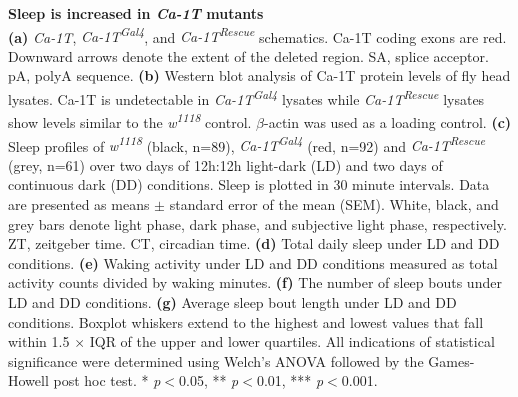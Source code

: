 \label{fig:3}
\textbf{Sleep is increased in \emph{Ca-\alpha1T} mutants}
\\
\textbf{(a)} \emph{Ca-\alpha1T}, \emph{Ca-\alpha1T\textsuperscript{Gal4}}, and \emph{Ca-\alpha1T\textsuperscript{Rescue}} schematics. 
Ca-\alpha1T coding exons are red.
Downward arrows denote the extent of the deleted region.
SA, splice acceptor.
pA, polyA sequence.  
\textbf{(b)} Western blot analysis of Ca-\alpha1T protein levels of fly head lysates.
Ca-\alpha1T is undetectable in \emph{Ca-\alpha1T\textsuperscript{Gal4}} lysates while \emph{Ca-\alpha1T\textsuperscript{Rescue}} lysates show levels similar to the \emph{w\textsuperscript{1118}} control.
$\beta$-actin was used as a loading control.
\textbf{(c)} Sleep profiles of \emph{w\textsuperscript{1118}} (black, n=89), \emph{Ca-\alpha1T\textsuperscript{Gal4}} (red, n=92) and \emph{Ca-\alpha1T\textsuperscript{Rescue}}  (grey, n=61) over two days of 12h:12h light-dark (LD) and two days of continuous dark (DD) conditions.
Sleep is plotted in 30 minute intervals.
Data are presented as means $\pm$ standard error of the mean (SEM).
White, black, and grey bars denote light phase, dark phase, and subjective light phase, respectively.
ZT, zeitgeber time.
CT, circadian time.
\textbf{(d)} Total daily sleep under LD and DD conditions.
\textbf{(e)} Waking activity under LD and DD conditions measured as total activity counts divided by waking minutes.
\textbf{(f)} The number of sleep bouts under LD and DD conditions.
\textbf{(g)} Average sleep bout length under LD and DD conditions.
Boxplot whiskers extend to the highest and lowest values that fall within 1.5 $\times$ IQR of the upper and lower quartiles.
All indications of statistical significance were determined using Welch's ANOVA followed by the Games-Howell post hoc test.
* \emph{p}$<$0.05, ** \emph{p}$<$0.01, *** \emph{p}$<$0.001.
